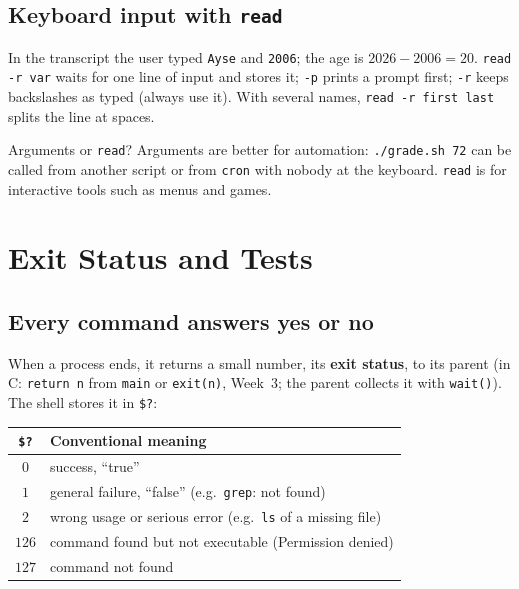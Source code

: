 \documentclass[11pt,a4paper]{article}
\newcommand{\term}[1]{\textbf{\color{mintdeep}#1}}
\newcommand{\cmd}[1]{\texttt{#1}}
\begin{document}
\subsection{Keyboard input with \texttt{read}}



In the transcript the user typed \texttt{Ayse} and \texttt{2006}; the age is $2026 - 2006 = 20$. \cmd{read -r var} waits for one line of input and stores it; \texttt{-p} prints a prompt first; \texttt{-r} keeps backslashes as typed (always use it). With several names, \cmd{read -r first last} splits the line at spaces.

Arguments or \texttt{read}? Arguments are better for automation: \texttt{./grade.sh 72} can be called from another script or from \cmd{cron} with nobody at the keyboard. \texttt{read} is for interactive tools such as menus and games.

\section{Exit Status and Tests}
\label{sec:status}

\subsection{Every command answers yes or no}

When a process ends, it returns a small number, its \term{exit status}, to its parent (in C: \cmd{return n} from \cmd{main} or \cmd{exit(n)}, Week~3; the parent collects it with \cmd{wait()}). The shell stores it in \texttt{\$?}:



\begin{center}
\small
\begin{tabular}{@{}cl@{}}
\toprule
\texttt{\$?} & \textbf{Conventional meaning}\\
\midrule
$0$ & success, “true”\\
$1$ & general failure, “false” (e.g.\ \cmd{grep}: not found)\\
$2$ & wrong usage or serious error (e.g.\ \cmd{ls} of a missing file)\\
$126$ & command found but not executable (Permission denied)\\
$127$ & command not found\\
\bottomrule
\end{tabular}
\end{center}
\end{document}
